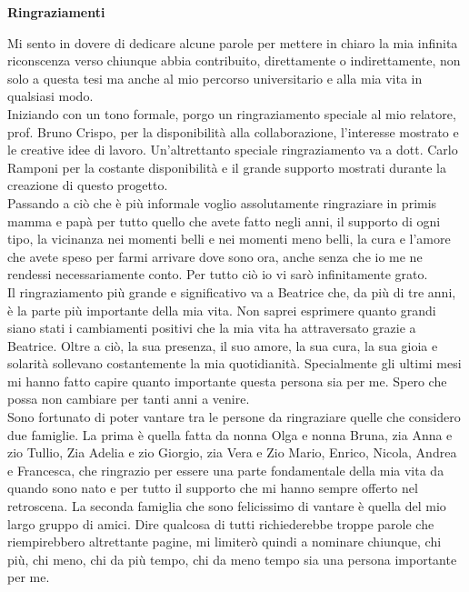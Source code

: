 \thispagestyle{empty}

\begin{center}
  {\bf \Huge Ringraziamenti}
\end{center}

\vspace{4cm}
Mi sento in dovere di dedicare alcune parole per mettere in chiaro la mia infinita riconscenza verso chiunque abbia contribuito, direttamente o indirettamente, non solo a questa tesi ma anche al mio percorso universitario e alla mia vita in qualsiasi modo.\\
Iniziando con un tono formale, porgo un ringraziamento speciale al mio relatore, prof. Bruno Crispo, per la disponibilità alla collaborazione, l'interesse mostrato e le creative idee di lavoro. Un'altrettanto speciale ringraziamento va a dott. Carlo Ramponi per la costante disponibilità e il grande supporto mostrati durante la creazione di questo progetto.\\
Passando a ciò che è più informale voglio assolutamente ringraziare in primis mamma e papà per tutto quello che avete fatto negli anni, il supporto di ogni tipo, la vicinanza nei momenti belli e nei momenti meno belli, la cura e l'amore che avete speso per farmi arrivare dove sono ora, anche senza che io me ne rendessi necessariamente conto. Per tutto ciò io vi sarò infinitamente grato.\\
Il ringraziamento più grande e significativo va a Beatrice che, da più di tre anni, è la parte più importante della mia vita. Non saprei esprimere quanto grandi siano stati i cambiamenti positivi che la mia vita ha attraversato grazie a Beatrice. Oltre a ciò, la sua presenza, il suo amore, la sua cura, la sua gioia e solarità sollevano costantemente la mia quotidianità. Specialmente gli ultimi mesi mi hanno fatto capire quanto importante questa persona sia per me. Spero che possa non cambiare per tanti anni a venire.\\
Sono fortunato di poter vantare tra le persone da ringraziare quelle che considero due famiglie. La prima è quella fatta da nonna Olga e nonna Bruna, zia Anna e zio Tullio, Zia Adelia e zio Giorgio, zia Vera e Zio Mario, Enrico, Nicola, Andrea e Francesca, che ringrazio per essere una parte fondamentale della mia vita da quando sono nato e per tutto il supporto che mi hanno sempre offerto nel retroscena.
La seconda famiglia che sono felicissimo di vantare è quella del mio largo gruppo di amici. Dire qualcosa di tutti richiederebbe troppe parole che riempirebbero altrettante pagine, mi limiterò quindi a nominare chiunque, chi più, chi meno, chi da più tempo, chi da meno tempo sia una persona importante per me.
